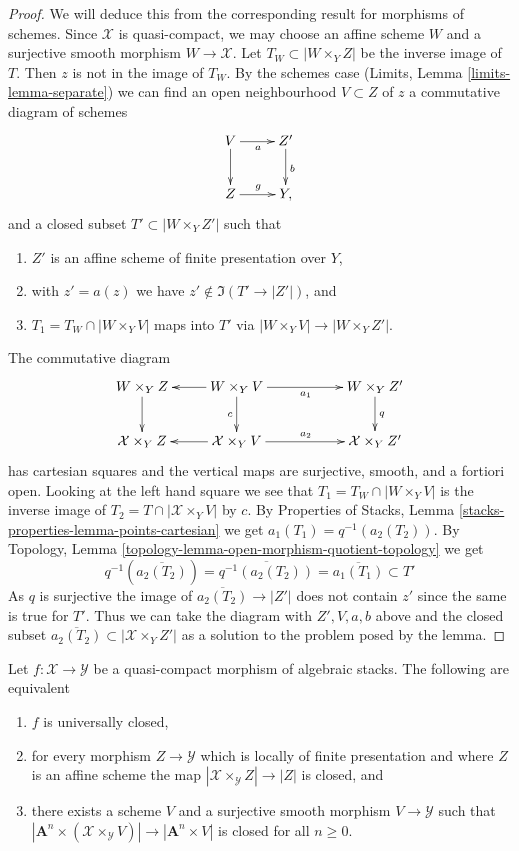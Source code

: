 \begin{proof}
We will deduce this from the corresponding result for morphisms of schemes.
Since $\mathcal{X}$ is quasi-compact, we may choose an affine scheme
$W$ and a surjective smooth morphism $W \to \mathcal{X}$.
Let $T_W \subset |W \times_Y Z|$ be the inverse image of $T$.
Then $z$ is not in the image of $T_W$.
By the schemes case (Limits, Lemma \ref{limits-lemma-separate})
we can find an open neighbourhood $V \subset Z$ of $z$
a commutative diagram of schemes
$$
\xymatrix{
V \ar[d] \ar[r]_a & Z' \ar[d]^b \\
Z \ar[r]^g & Y,
}
$$
and a closed subset $T' \subset |W \times_Y Z'|$ such that
\begin{enumerate}
\item $Z'$ is an affine scheme of finite presentation over $Y$,
\item with $z' = a(z)$ we have $z' \not \in \Im(T' \to |Z'|)$, and
\item $T_1 = T_W \cap |W \times_Y V|$ maps into $T'$ via
$|W \times_Y V| \to |W \times_Y Z'|$.
\end{enumerate}
The commutative diagram
$$
\xymatrix{
W \times_Y Z \ar[d] &
W \times_Y V \ar[l] \ar[rr]_{a_1} \ar[d]_c & &
W \times_Y Z' \ar[d]^q \\
\mathcal{X} \times_Y Z &
\mathcal{X} \times_Y V \ar[l] \ar[rr]^{a_2} & &
\mathcal{X} \times_Y Z'
}
$$
has cartesian squares and the vertical maps are surjective, smooth,
and a fortiori open. Looking at the left hand square we
see that $T_1 = T_W \cap |W \times_Y V|$ is the inverse image of
$T_2 = T \cap |\mathcal{X} \times_Y V|$ by $c$. By Properties of Stacks, Lemma
\ref{stacks-properties-lemma-points-cartesian} we get
$a_1(T_1) = q^{-1}(a_2(T_2))$.
By Topology, Lemma \ref{topology-lemma-open-morphism-quotient-topology}
we get
$$
q^{-1}\left(\overline{a_2(T_2)}\right) =
\overline{q^{-1}(a_2(T_2))} =
\overline{a_1(T_1)} \subset T'
$$
As $q$ is surjective the image of $\overline{a_2(T_2)} \to |Z'|$
does not contain $z'$ since the same is true for $T'$.
Thus we can take the diagram with $Z', V, a, b$ above and the
closed subset $\overline{a_2(T_2)} \subset |\mathcal{X} \times_Y Z'|$ as
a solution to the problem posed by the lemma.
\end{proof}

\begin{lemma}
\label{lemma-test-universally-closed}
Let $f : \mathcal{X} \to \mathcal{Y}$ be a quasi-compact morphism of
algebraic stacks. The following are equivalent
\begin{enumerate}
\item $f$ is universally closed,
\item for every morphism $Z \to \mathcal{Y}$ which is locally of finite
presentation and where $Z$ is an affine scheme
the map $|\mathcal{X} \times_{\mathcal{Y}} Z| \to |Z|$ is closed, and
\item there exists a scheme $V$ and a surjective smooth morphism
$V \to \mathcal{Y}$ such that
$|\mathbf{A}^n \times (\mathcal{X} \times_\mathcal{Y} V)|
\to |\mathbf{A}^n \times V|$ is closed for all $n \geq 0$.
\end{enumerate}
\end{lemma}

